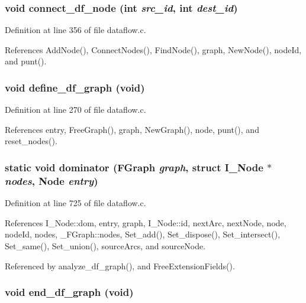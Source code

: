 \subsubsection{\setlength{\rightskip}{0pt plus 5cm}void connect\_\-df\_\-node (int {\em src\_\-id}, int {\em dest\_\-id})}\label{dataflow_8c_04c9b99c0375698dcfe160ee36ca146c}




Definition at line 356 of file dataflow.c.

References Add\-Node(), Connect\-Nodes(), Find\-Node(), graph, New\-Node(), node\-Id, and punt().
\subsubsection{\setlength{\rightskip}{0pt plus 5cm}void define\_\-df\_\-graph (void)}\label{dataflow_8c_18d17ac37de12e3bc188f054718aa646}




Definition at line 270 of file dataflow.c.

References entry, Free\-Graph(), graph, New\-Graph(), node, punt(), and reset\_\-nodes().
\subsubsection{\setlength{\rightskip}{0pt plus 5cm}static void dominator (\bf{FGraph} {\em graph}, struct \bf{I\_\-Node} $\ast$ {\em nodes}, \bf{Node} {\em entry})\hspace{0.3cm}{\tt  [static]}}\label{dataflow_8c_07aa15a7171ce573fca1008cd5c6fcd9}




Definition at line 725 of file dataflow.c.

References I\_\-Node::dom, entry, graph, I\_\-Node::id, next\-Arc, next\-Node, node, node\-Id, nodes, \_\-FGraph::nodes, Set\_\-add(), Set\_\-dispose(), Set\_\-intersect(), Set\_\-same(), Set\_\-union(), source\-Arcs, and source\-Node.

Referenced by analyze\_\-df\_\-graph(), and Free\-Extension\-Fields().
\subsubsection{\setlength{\rightskip}{0pt plus 5cm}void end\_\-df\_\-graph (void)}\label{dataflow_8c_bd53f0f6499bdd55bc4e4d8af145ccb5}




